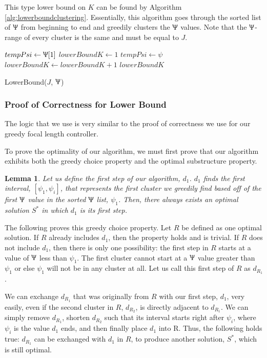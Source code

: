 \documentclass[conference]{IEEEtran}
\theoremstyle{plain}%
\newtheorem{lemma}[theorem]{Lemma}
\begin{document}
This type lower bound on $K$ can be found by Algorithm \ref{alg:lowerboundclustering}. Essentially, this algorithm goes through the sorted list of $\Uppsi$ from beginning to end and greedily clusters the $\Uppsi$ values. Note that the $\Uppsi$-range of every cluster is the same and must be equal to $J$.

\begin{algorithm}
\begin{algorithmic}[1]
\STATE $tempPsi \leftarrow \Uppsi[1]$
\STATE $lowerBoundK \leftarrow 1$
\FOR{$\psi \in \Uppsi$}
\STATE $tempPsi \leftarrow \psi$
\STATE $lowerBoundK \leftarrow lowerBoundK + 1$
\ENDIF
\ENDFOR
\RETURN $lowerBoundK$
\end{algorithmic}
\caption{LowerBound($J$, $\Uppsi$)} 
\label{alg:lowerboundclustering}
\end{algorithm}

\subsubsection{Proof of Correctness for Lower Bound}
The logic that we use is very similar to the proof of correctness we use for our greedy focal length controller.

To prove the optimality of our algorithm, we must first prove that our algorithm exhibits both the greedy choice property and the optimal substructure property.
\begin{lemma} %
Let us define the first step of our algorithm, $d_1$. $d_1$ finds the first interval, $[\psi_1, \psi_i]$, that represents the first cluster we greedily find based off of the first $\Uppsi$ value in the sorted $\Uppsi$ list, $\psi_1$. Then, there always exists an optimal solution $S^*$ in which $d_1$ is its first step.
\end{lemma}
The following proves this greedy choice property. Let $R$ be defined as one optimal solution. If $R$ already includes $d_1$, then the property holds and is trivial. If $R$ does not include $d_1$, then there is only one possibility: the first step in $R$ starts at a value of $\Uppsi$ less than $\psi_1$. The first cluster cannot start at a $\Uppsi$ value greater than $\psi_1$ or else $\psi_1$ will not be in any cluster at all. Let us call this first step of $R$ as $d_{R_1}$.

We can exchange $d_{R_1}$ that was originally from $R$ with our first step, $d_1$, very easily, even if the second cluster in $R$, $d_{R_2}$, is directly adjacent to $d_{R_1}$. We can simply remove $d_{R_1}$, shorten $d_{R_2}$ such that its interval starts right after $\psi_i$, where $\psi_i$ is the value $d_1$ ends, and then finally place $d_1$ into R. Thus, the following holds true: $d_{R_1}$ can be exchanged with $d_1$ in $R$, to produce another solution, $S^*$, which is still optimal.
\end{document}
